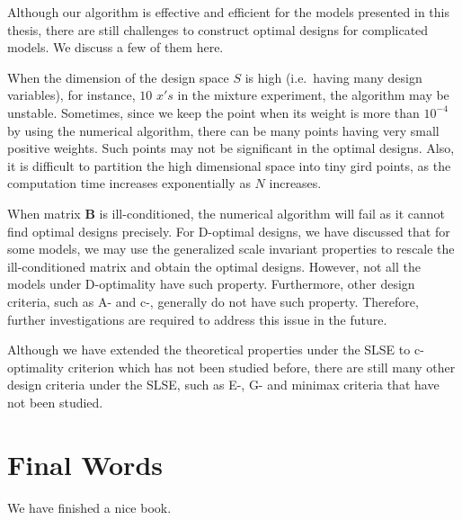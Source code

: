 \documentclass[
]{book}
\theoremstyle{definition}
\theoremstyle{definition}
\theoremstyle{definition}
\theoremstyle{definition}
\theoremstyle{remark}
\begin{document}
Although our algorithm is effective and efficient for the models presented in this thesis, there are still challenges to construct optimal designs for complicated models. We discuss a few of them here.

When the dimension of the design space \(S\) is high (i.e.~having many design variables), for instance, \(10\) \(x's\) in the mixture experiment, the algorithm may be unstable. Sometimes, since we keep the point when its weight is more than \(10^{-4}\) by using the numerical algorithm, there can be many points having very small positive weights. Such points may not be significant in the optimal designs. Also, it is difficult to partition the high dimensional space into tiny gird points, as the computation time increases exponentially as \(N\) increases.

When matrix \(\boldsymbol{B}\) is ill-conditioned, the numerical algorithm will fail as it cannot find optimal designs precisely. For D-optimal designs, we have discussed that for some models, we may use the generalized scale invariant properties to rescale the ill-conditioned matrix and obtain the optimal designs. However, not all the models under D-optimality have such property. Furthermore, other design criteria, such as A- and c-, generally do not have such property. Therefore, further investigations are required to address this issue in the future.

Although we have extended the theoretical properties under the SLSE to c-optimality criterion which has not been studied before, there are still many other design criteria under the SLSE, such as E-, G- and minimax criteria that have not been studied.

\chapter{Final Words}\label{final-words}

We have finished a nice book.

  
\end{document}

